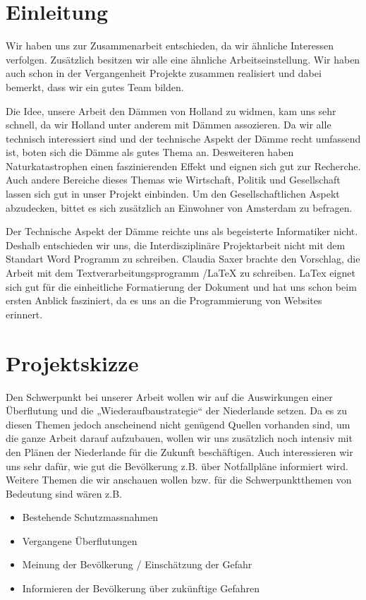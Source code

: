\part{Einleitung}

Wir haben uns zur Zusammenarbeit entschieden, da wir ähnliche Interessen verfolgen.
Zusätzlich besitzen wir alle eine ähnliche Arbeitseinstellung. 
Wir haben auch schon in der Vergangenheit Projekte zusammen realisiert und dabei bemerkt, dass wir ein gutes Team bilden.
 
Die Idee, unsere Arbeit den Dämmen von Holland zu widmen, kam uns sehr schnell, da wir Holland unter anderem mit Dämmen assozieren.
Da wir alle technisch interessiert sind und der technische Aspekt der Dämme recht umfassend ist, boten sich die Dämme als gutes Thema an. 
Desweiteren haben Naturkatastrophen einen faszinierenden Effekt und eignen sich gut zur Recherche.
Auch andere Bereiche dieses Themas wie Wirtschaft, Politik und Gesellschaft lassen sich gut in unser Projekt einbinden. 
Um den Gesellschaftlichen Aspekt abzudecken, bittet es sich zusätzlich an Einwohner von Amsterdam zu befragen.

Der Technische Aspekt der Dämme reichte uns als begeisterte Informatiker nicht. Deshalb entschieden wir uns, die Interdisziplinäre 
Projektarbeit nicht mit dem Standart Word Programm zu schreiben. Claudia Saxer brachte den Vorschlag, die Arbeit mit dem Textverarbeitungsprogramm
{/LaTeX} zu schreiben. 
LaTex eignet sich gut für die einheitliche Formatierung der Dokument und hat uns schon beim ersten Anblick fasziniert, da es uns an die 
Programmierung  von Websites erinnert.


\part{Projektskizze}
 
Den Schwerpunkt bei unserer Arbeit wollen wir auf die Auswirkungen 
einer Überflutung und die „Wiederaufbaustrategie“ der Niederlande setzen. 
Da es zu diesen Themen jedoch anscheinend nicht genügend Quellen vorhanden sind, 
um die ganze Arbeit darauf aufzubauen, wollen wir uns zusätzlich noch intensiv mit 
den Plänen der Niederlande für die Zukunft beschäftigen. Auch interessieren wir uns 
sehr dafür, wie gut die Bevölkerung z.B. über Notfallpläne informiert wird. 
Weitere Themen die wir anschauen wollen bzw. für die Schwerpunktthemen von 
Bedeutung sind wären z.B.
 
\begin{itemize}  
\item Bestehende Schutzmassnahmen
\item Vergangene Überflutungen
\item Meinung der Bevölkerung / Einschätzung der Gefahr
\item Informieren der Bevölkerung über zukünftige Gefahren
\end{itemize}    

